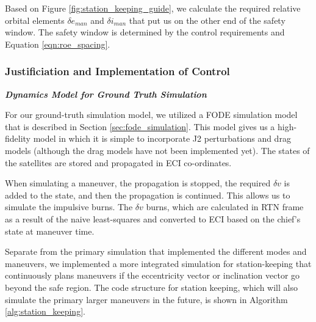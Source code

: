 Based on Figure \ref{fig:station_keeping_guide}, we calculate the required relative orbital elements $\delta e_{man}$ and $\delta i_{man}$ that put us on the other end of the safety window. The safety window is determined by the control requirements and Equation \ref{eqn:roe_spacing}.

\subsubsection{Justificiation and Implementation of Control}

\textbf{\textit{Dynamics Model for Ground Truth Simulation}}

For our ground-truth simulation model, we utilized a FODE simulation model that is described in Section \ref{sec:fode_simulation}. This model gives us a high-fidelity model in which it is simple to incorporate J2 perturbations and drag models (although the drag models have not been implemented yet). The states of the satellites are stored and propagated in ECI co-ordinates. 

When simulating a maneuver, the propagation is stopped, the required $\delta v$ is added to the state, and then the propagation is continued. This allows us to simulate the impulsive burns. The $\delta v$ burns, which are calculated in RTN frame as a result of the naive least-squares and converted to ECI based on the chief's state at maneuver time.

Separate from the primary simulation that implemented the different modes and maneuvers, we implemented a more integrated simulation for station-keeping that continuously plans maneuvers if the eccentricity vector or inclination vector go beyond the safe region. The code structure for station keeping, which will also simulate the primary larger maneuvers in the future, is shown in Algorithm \ref{alg:station_keeping}.

